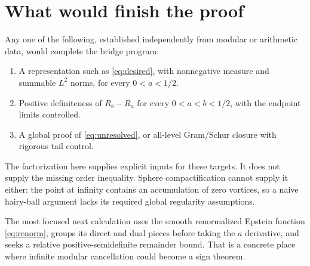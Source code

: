 \documentclass[11pt,letterpaper]{article}
\numberwithin{equation}{section}
\theoremstyle{remark}\newtheorem{remark}[proposition]{Remark}
\begin{document}
\section{What would finish the proof}
Any one of the following, established independently from modular or arithmetic data, would complete the bridge program:
\begin{enumerate}
 \item A representation such as \eqref{eq:desired}, with nonnegative measure and summable $L^2$ norms, for every $0<a<1/2$.
 \item Positive definiteness of $R_b-R_a$ for every $0<a<b<1/2$, with the endpoint limits controlled.
 \item A global proof of \eqref{eq:unresolved}, or all-level Gram/Schur closure with rigorous tail control.
\end{enumerate}
The factorization here supplies explicit inputs for these targets. It does not supply the missing order inequality. Sphere compactification cannot supply it either: the point at infinity contains an accumulation of zero vortices, so a naive hairy-ball argument lacks its required global regularity assumptions.

The most focused next calculation uses the smooth renormalized Epstein function \eqref{eq:renorm}, groups its direct and dual pieces before taking the $a$ derivative, and seeks a relative positive-semidefinite remainder bound. That is a concrete place where infinite modular cancellation could become a sign theorem.
\end{document}
